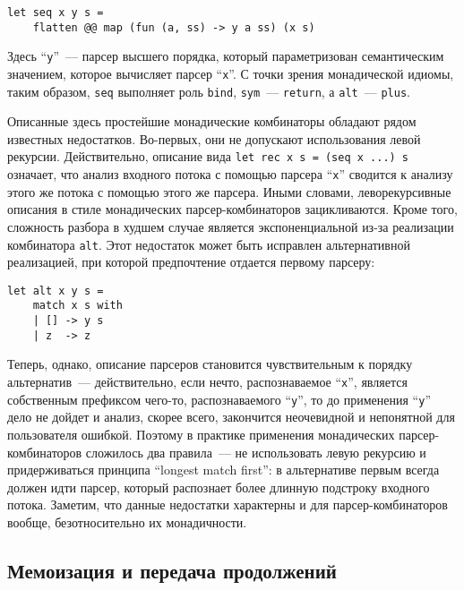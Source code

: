 \documentclass[conference]{IEEEtran}
\begin{document}
\begin{lstlisting}[basicstyle=\small]
  let seq x y s =
    flatten @@ map (fun (a, ss) -> y a ss) (x s)
\end{lstlisting}

Здесь ``\lstinline|y|''~--- парсер высшего порядка, который параметризован семантическим значением, которое вычисляет парсер ``\lstinline|x|''. С точки зрения монадической
идиомы, таким образом, \lstinline|seq| выполняет роль \lstinline|bind|, \lstinline|sym|~--- \lstinline|return|, а \lstinline|alt|~--- \lstinline|plus|.

Описанные здесь простейшие монадические комбинаторы обладают рядом известных недостатков. Во-первых, они не допускают использования левой рекурсии. Действительно, описание
вида \lstinline|let rec x s = (seq x ...) s| означает, что анализ входного потока с помощью парсера ``\lstinline|x|'' сводится к анализу этого же потока с помощью этого
же парсера. Иными словами, леворекурсивные описания в стиле монадических парсер-комбинаторов зацикливаются. Кроме того, сложность разбора в худшем случае является экспоненциальной
из-за реализации комбинатора \lstinline|alt|. Этот недостаток может быть исправлен альтернативной реализацией, при которой предпочтение отдается первому парсеру:

\begin{lstlisting}[basicstyle=\small]
  let alt x y s =
    match x s with
    | [] -> y s
    | z  -> z
\end{lstlisting}

Теперь, однако, описание парсеров становится чувствительным к порядку альтернатив~--- действительно, если нечто, распознаваемое ``\lstinline|x|'', является собственным префиксом
чего-то, распознаваемого ``\lstinline|y|'', то до применения ``\lstinline|y|'' дело не дойдет и анализ, скорее всего, закончится неочевидной и непонятной для
пользователя ошибкой. Поэтому в практике применения монадических парсер-комбинаторов сложилось два правила~--- не использовать левую рекурсию и придерживаться
принципа ``longest match first'': в альтернативе первым всегда должен идти парсер, который распознает более длинную подстроку входного потока. Заметим, что данные недостатки
характерны и для парсер-комбинаторов вообще, безотносительно их монадичности.

\subsection{Мемоизация и передача продолжений}
\end{document}
